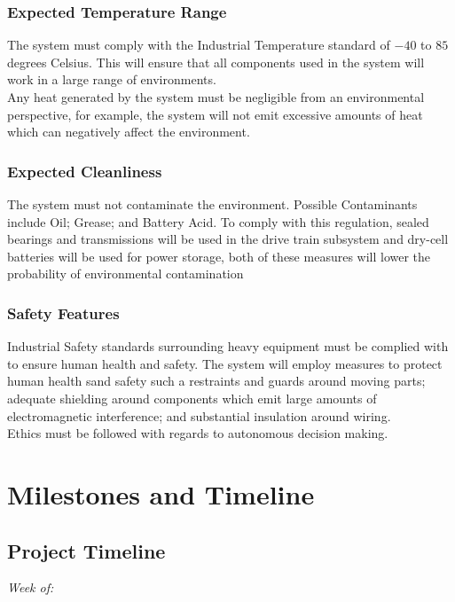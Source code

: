 \documentclass[12pt]{article}
\begin{document}
\subsubsection{Expected Temperature Range}
The system must comply with the Industrial Temperature standard of $-40$ to $85$ degrees Celsius. This will ensure that all components used in the system will work in a large range of environments. \\

Any heat generated by the system must be negligible from an environmental perspective, for example, the system will not emit excessive amounts of heat which can negatively affect the environment. 
\subsubsection{Expected Cleanliness}
The system must not contaminate the environment. Possible Contaminants include Oil; Grease; and Battery Acid. To comply with this regulation, sealed bearings and transmissions will be used in the drive train subsystem and dry-cell batteries will be used for power storage, both of these measures will lower the probability of environmental contamination
\subsubsection{Safety Features}
Industrial Safety standards surrounding heavy equipment must be complied with to ensure human health and safety. The system will employ measures to protect human health sand safety such a restraints and guards around moving parts; adequate shielding around components which emit large amounts of electromagnetic interference; and substantial insulation around wiring. \\

Ethics must be followed with regards to autonomous decision making. 

\section{Milestones and Timeline}
\subsection{Project Timeline}


\textit{Week of:}
\end{document}
